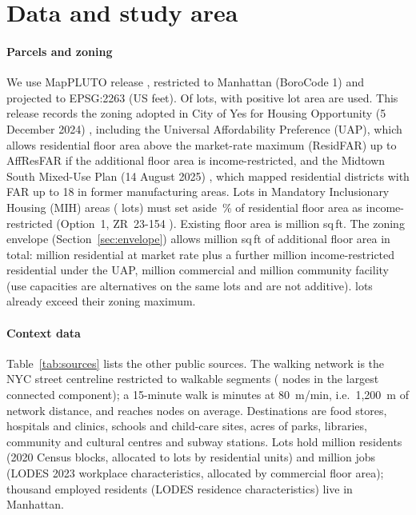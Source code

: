 \documentclass[preprint,12pt]{elsarticle}
\begin{document}
\section{Data and study area}\label{sec:data}

\paragraph{Parcels and zoning} We use MapPLUTO release \PlutoRelease{} \cite{dcp_mappluto}, restricted to Manhattan (BoroCode 1) and projected to EPSG:2263 (US feet). Of \NParcelsRaw{} lots, \NParcels{} with positive lot area are used. This release records the zoning adopted in City of Yes for Housing Opportunity (5 December 2024) \cite{nyc_coy2024}, including the Universal Affordability Preference (UAP), which allows residential floor area above the market-rate maximum (ResidFAR) up to AffResFAR if the additional floor area is income-restricted, and the Midtown South Mixed-Use Plan (14 August 2025) \cite{nyc_msmx2025}, which mapped residential districts with FAR up to 18 in former manufacturing areas. Lots in Mandatory Inclusionary Housing (MIH) areas (\NMihLots{} lots) must set aside \MihShare{}\,\% of residential floor area as income-restricted (Option~1, ZR~23-154 \cite{nyc_zr}). Existing floor area is \ExistingFAM{} million sq\,ft. The zoning envelope (Section~\ref{sec:envelope}) allows \CapTotalM{} million sq\,ft of additional floor area in total: \CapResMarketM{} million residential at market rate plus a further \CapResUapM{} million income-restricted residential under the UAP, \CapComM{} million commercial and \CapFacM{} million community facility (use capacities are alternatives on the same lots and are not additive). \LotsAboveMax{} lots already exceed their zoning maximum.

\paragraph{Context data} Table~\ref{tab:sources} lists the other public sources. The walking network is the NYC street centreline restricted to walkable segments (\WalkNodes{} nodes in the largest connected component); a 15-minute walk is \WalkMinutes{} minutes at 80~m/min, i.e.\ 1{,}200~m of network distance, and reaches \WalkshedNodes{} nodes on average. Destinations are \DestFood{} food stores, \DestHealth{} hospitals and clinics, \DestEducation{} schools and child-care sites, \DestParksAcres{} acres of parks, \DestCivic{} libraries, community and cultural centres and \DestTransit{} subway stations. Lots hold \PopTotalM{} million residents (2020 Census blocks, allocated to lots by residential units) and \JobsTotalM{} million jobs (LODES 2023 workplace characteristics, allocated by commercial floor area); \WorkersTotalK{} thousand employed residents (LODES residence characteristics) live in Manhattan.
\end{document}
